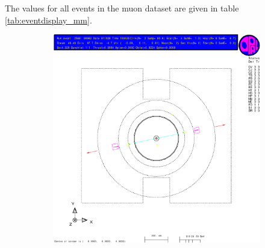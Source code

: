 \documentclass[11pt, a4paper]{article}
\numberwithin{equation}{section}
\begin{document}
The values for all events in the muon dataset are given in table \ref{tab:eventdisplay_mm}.
\begin{figure}[h]
	\centering
	\begin{subfigure}{\textwidth}
		\centering
		\includegraphics[width=.9\textwidth]{./data/tag1/mm_pics/cropped/mm_02}
	\end{subfigure}
\end{figure}
\end{document}

